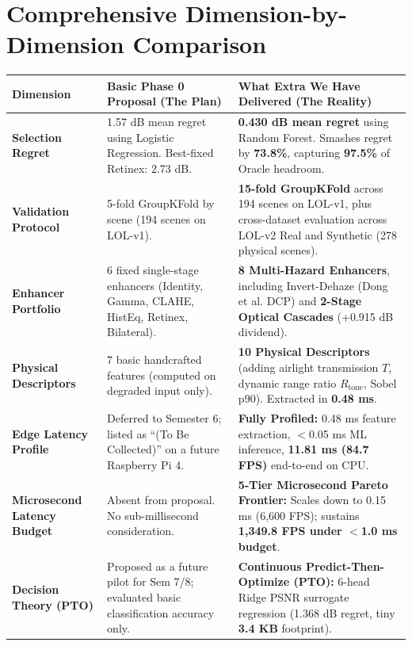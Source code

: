 \documentclass[10pt,a4paper]{article}
\begin{document}
\vspace{0.3cm}

\section{Comprehensive Dimension-by-Dimension Comparison}

\begin{table}[h!]
\small
\centering
\begin{tabularx}{\textwidth}{p{3.2cm} p{5.5cm} X}
\toprule
\textbf{Dimension} & \textbf{Basic Phase 0 Proposal (The Plan)} & \textbf{What Extra We Have Delivered (The Reality)} \\
\midrule
\textbf{Selection Regret} & 1.57 dB mean regret using Logistic Regression. Best-fixed Retinex: 2.73 dB. & \textbf{0.430 dB mean regret} using Random Forest. Smashes regret by \textbf{73.8\%}, capturing \textbf{97.5\%} of Oracle headroom. \\
\addlinespace
\textbf{Validation Protocol} & 5-fold GroupKFold by scene (194 scenes on LOL-v1). & \textbf{15-fold GroupKFold} across 194 scenes on LOL-v1, plus cross-dataset evaluation across LOL-v2 Real and Synthetic (278 physical scenes). \\
\addlinespace
\textbf{Enhancer Portfolio} & 6 fixed single-stage enhancers (Identity, Gamma, CLAHE, HistEq, Retinex, Bilateral). & \textbf{8 Multi-Hazard Enhancers}, including Invert-Dehaze (Dong et al. DCP) and \textbf{2-Stage Optical Cascades} (+0.915 dB dividend). \\
\addlinespace
\textbf{Physical Descriptors} & 7 basic handcrafted features (computed on degraded input only). & \textbf{10 Physical Descriptors} (adding airlight transmission $T$, dynamic range ratio $R_{\text{tone}}$, Sobel p90). Extracted in \textbf{0.48 ms}. \\
\addlinespace
\textbf{Edge Latency Profile} & Deferred to Semester 6; listed as ``(To Be Collected)'' on a future Raspberry Pi 4. & \textbf{Fully Profiled:} 0.48 ms feature extraction, $<$0.05 ms ML inference, \textbf{11.81 ms (84.7 FPS)} end-to-end on CPU. \\
\addlinespace
\textbf{Microsecond Latency Budget} & Absent from proposal. No sub-millisecond consideration. & \textbf{5-Tier Microsecond Pareto Frontier:} Scales down to 0.15 ms (6,600 FPS); sustains \textbf{1,349.8 FPS under $<$1.0 ms budget}. \\
\addlinespace
\textbf{Decision Theory (PTO)} & Proposed as a future pilot for Sem 7/8; evaluated basic classification accuracy only. & \textbf{Continuous Predict-Then-Optimize (PTO):} 6-head Ridge PSNR surrogate regression (1.368 dB regret, tiny \textbf{3.4 KB} footprint). \\

\end{tabularx}
\end{table}
\end{document}
